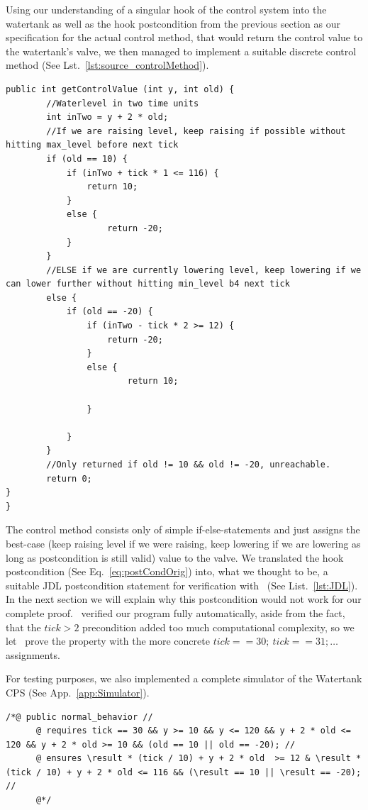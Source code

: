 Using our understanding of a singular hook of the control system into the watertank as well as the hook postcondition from the previous section as our specification for the actual control method, that would return the control value to the watertank's valve, we then managed to implement a suitable discrete control method (See Lst.~\ref{lst:source_controlMethod}).

\begin{lstlisting}[label=lst:source_controlMethod]
public int getControlValue (int y, int old) {
		//Waterlevel in two time units
		int inTwo = y + 2 * old;
		//If we are raising level, keep raising if possible without hitting max_level before next tick
		if (old == 10) {
			if (inTwo + tick * 1 <= 116) {
				return 10;
			}
			else {
					return -20;
			}
		}
		//ELSE if we are currently lowering level, keep lowering if we can lower further without hitting min_level b4 next tick
		else {
			if (old == -20) {
				if (inTwo - tick * 2 >= 12) {
					return -20;
				}
				else {
						return 10;
				
				}
		
			}
		}
		//Only returned if old != 10 && old != -20, unreachable.
		return 0;
}
}
\end{lstlisting}

The control method consists only of simple if-else-statements and just assigns the best-case (keep raising level if we were raising, keep lowering if we are lowering as long as postcondition is still valid) value to the valve. We translated the hook postcondition (See  Eq.~\ref{eq:postCondOrig}) into, what we thought to be, a suitable JDL postcondition statement for verification with \key~(See List.~\ref{lst:JDL}). In the next section we will explain why this postcondition would not work for our complete proof. \key~verified our program fully automatically, aside from the fact, that the \(tick>2\) precondition added too much computational complexity, so we let \key~prove the property with the more concrete \(tick==30;~tick==31;\dots\) assignments. 

For testing purposes, we also implemented a complete simulator of the Watertank CPS (See App.~\ref{app:Simulator}).

\begin{lstlisting}[label=lst:JDL]
	/*@ public normal_behavior //
	  @ requires tick == 30 && y >= 10 && y <= 120 && y + 2 * old <= 120 && y + 2 * old >= 10 && (old == 10 || old == -20); //
	  @ ensures \result * (tick / 10) + y + 2 * old  >= 12 & \result * (tick / 10) + y + 2 * old <= 116 && (\result == 10 || \result == -20); //
	  @*/
\end{lstlisting} 

